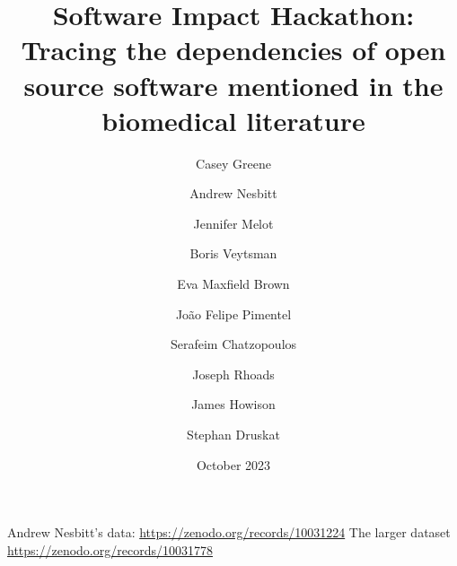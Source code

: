 \documentclass{article}
\title{Software Impact Hackathon:  Tracing the dependencies of open
  source software mentioned in the biomedical literature}
\date{October 2023}
\author{Casey Greene \and
Andrew Nesbitt \and
Jennifer Melot \and
Boris Veytsman \and
Eva Maxfield Brown \and
João Felipe Pimentel \and
Serafeim Chatzopoulos \and
Joseph Rhoads \and
James Howison \and
Stephan Druskat}
\begin{document}
\maketitle

Andrew Nesbitt's data: \url{https://zenodo.org/records/10031224}
The larger dataset \url{https://zenodo.org/records/10031778} 
\end{document}
